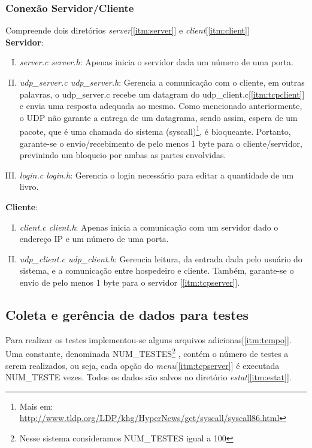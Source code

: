 \documentclass[a4paper,10pt]{article}
\begin{document}
\subsubsection{Conexão Servidor/Cliente}
Compreende dois diretórios \emph{server}[\ref{itm:server}] e \emph{client}[\ref{itm:client}]
\\\textbf{Servidor}:
\begin{enumerate}[I.]
\item \emph{server.c server.h}: Apenas inicia o servidor dada um número de uma porta.
\item \label{itm:tcpserver} \emph{udp\_server.c udp\_server.h}: Gerencia a comunicação com o cliente, em outras palavras, o udp\_server.c recebe um datagram do udp\_client.c[\ref{itm:tcpclient}] e envia uma resposta adequada ao mesmo. Como mencionado anteriormente, o UDP não garante a entrega de um datagrama, sendo assim, espera 
de um pacote, que é uma chamada do sistema (syscall)\footnote{Mais em: \url{http://www.tldp.org/LDP/khg/HyperNews/get/syscall/syscall86.html} }, é bloqueante. 
Portanto, garante-se o envio/recebimento de pelo menos 1 byte para o cliente/servidor, previnindo um bloqueio por ambas as partes envolvidas.
\item \emph{login.c login.h}: Gerencia o login necessário para editar a quantidade de um livro.
\end{enumerate}
\textbf{Cliente}:
\begin{enumerate}[I.]
\item \emph{client.c client.h}: Apenas inicia a comunicação com um servidor dado o endereço IP e um número de uma porta.
\item \label{itm:tcpclient} \emph{udp\_client.c udp\_client.h}: Gerencia leitura, da entrada dada pelo usuário do sistema, e a comunicação entre hospedeiro e cliente. Também, garante-se o envio de pelo menos 1 byte para o servidor [\ref{itm:tcpserver}].
\end{enumerate}
\subsection{Coleta e gerência de dados para testes}
Para realizar os testes implementou-se alguns arquivos adicionas[\ref{itm:tempo}]. Uma constante, denominada NUM\_TESTES\footnote{Nesse sistema consideramos NUM\_TESTES igual a 100} , contém o número de testes a serem realizados, ou seja, cada opção do \emph{menu}[\ref{itm:tcpserver}] é executada NUM\_TESTE vezes. Todos os dados são 
salvos no diretório \emph{estat}[\ref{itm:estat}].
\end{document}
